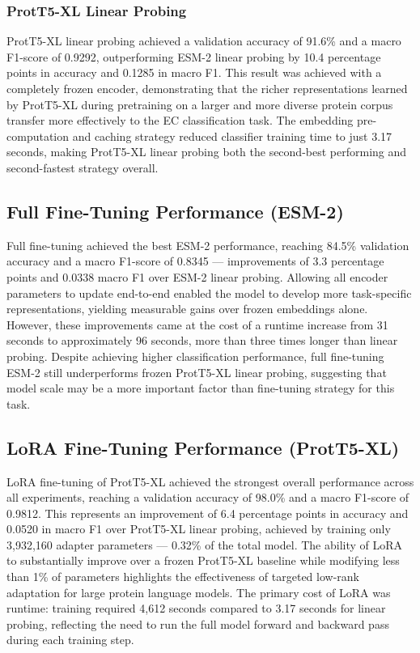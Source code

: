 \documentclass{article}
\begin{document}
\subsubsection*{ProtT5-XL Linear Probing}

ProtT5-XL linear probing achieved a validation accuracy of 91.6\% and a macro F1-score of 0.9292, outperforming ESM-2 linear probing by 10.4 percentage points in accuracy and 0.1285 in macro F1. This result was achieved with a completely frozen encoder, demonstrating that the richer representations learned by ProtT5-XL during pretraining on a larger and more diverse protein corpus transfer more effectively to the EC classification task. The embedding pre-computation and caching strategy reduced classifier training time to just 3.17 seconds, making ProtT5-XL linear probing both the second-best performing and second-fastest strategy overall.

\subsection{Full Fine-Tuning Performance (ESM-2)}

Full fine-tuning achieved the best ESM-2 performance, reaching 84.5\% validation accuracy and a macro F1-score of 0.8345 — improvements of 3.3 percentage points and 0.0338 macro F1 over ESM-2 linear probing. Allowing all encoder parameters to update end-to-end enabled the model to develop more task-specific representations, yielding measurable gains over frozen embeddings alone. However, these improvements came at the cost of a runtime increase from 31 seconds to approximately 96 seconds, more than three times longer than linear probing. Despite achieving higher classification performance, full fine-tuning ESM-2 still underperforms frozen ProtT5-XL linear probing, suggesting that model scale may be a more important factor than fine-tuning strategy for this task.

\subsection{LoRA Fine-Tuning Performance (ProtT5-XL)}

LoRA fine-tuning of ProtT5-XL achieved the strongest overall performance across all experiments, reaching a validation accuracy of 98.0\% and a macro F1-score of 0.9812. This represents an improvement of 6.4 percentage points in accuracy and 0.0520 in macro F1 over ProtT5-XL linear probing, achieved by training only 3,932,160 adapter parameters — 0.32\% of the total model. The ability of LoRA to substantially improve over a frozen ProtT5-XL baseline while modifying less than 1\% of parameters highlights the effectiveness of targeted low-rank adaptation for large protein language models. The primary cost of LoRA was runtime: training required 4,612 seconds compared to 3.17 seconds for linear probing, reflecting the need to run the full model forward and backward pass during each training step.
\end{document}
